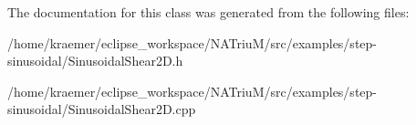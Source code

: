 The documentation for this class was generated from the following files\-:\begin{DoxyCompactItemize}
\item 
/home/kraemer/eclipse\-\_\-workspace/\-N\-A\-Triu\-M/src/examples/step-\/sinusoidal/Sinusoidal\-Shear2\-D.\-h\item 
/home/kraemer/eclipse\-\_\-workspace/\-N\-A\-Triu\-M/src/examples/step-\/sinusoidal/Sinusoidal\-Shear2\-D.\-cpp\end{DoxyCompactItemize}
